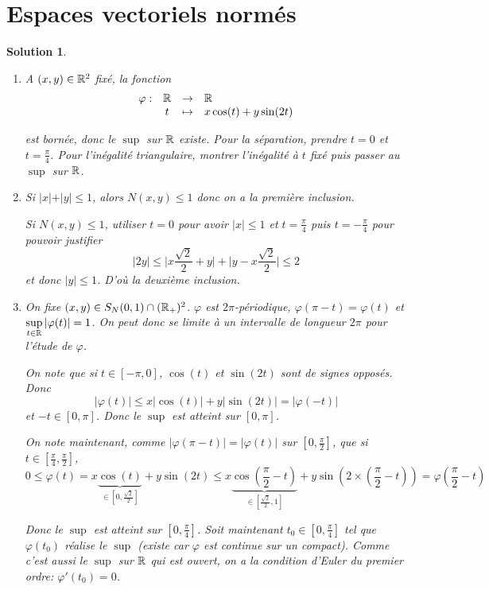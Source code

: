 \documentclass[12pt]{article}
\newtheorem{solution}{Solution}[section]
\theoremstyle{remark}
\newcommand{\function}[5]{
	$$
	\begin{array}{rccl}
		#1: & #2 & \to & #3 \\
		& #4 & \mapsto & #5
	\end{array}
	$$
}
\numberwithin{equation}{section}
\begin{document}
\section{Espaces vectoriels normés}

\begin{solution}
	\phantom{}
	\begin{enumerate}
		\item A $(x,y)\in\mathbb{R}^{2}$ fixé, la fonction \function{\varphi}{\R}{\R}{t}{x\cos(t)+y\sin(2t)}
		est bornée, donc le $\sup$ sur $\mathbb{R}$ existe. Pour la séparation, prendre $t=0$ et $t=\frac{\pi}{4}$. Pour l'inégalité triangulaire, montrer l'inégalité à $t$ fixé puis passer au $\sup$ sur $\mathbb{R}$.
		
		\item Si $\vert x\vert+\vert y\vert\leqslant1$, alors $N(x,y)\leqslant 1$ donc on a la première inclusion. 
		
		Si $N(x,y)\leqslant 1$, utiliser $t=0$ pour avoir $\vert x\vert\leqslant1$ et $t=\frac{\pi}{4}$ puis $t=-\frac{\pi}{4}$ pour pouvoir justifier
		$$\vert 2y\vert\leqslant \Biggl\vert x\frac{\sqrt{2}}{2}+y\Biggr\vert+\Biggl\vert y-x\frac{\sqrt{2}}{2}\Biggr\vert\leqslant 2$$
		et donc $\vert y\vert\leqslant1$. D'où la deuxième inclusion. 

		\item On fixe $(x,y)\in S_{N}(0,1)\cap(\mathbb{R}_{+})^{2}$. $\varphi$ est $2\pi$-périodique, $\varphi(\pi-t)=\varphi(t)$ et $\sup\limits_{t\in\mathbb{R}}\vert\varphi(t)\vert=1$. On peut donc se limite à un intervalle de longueur $2\pi$ pour l'étude de $\varphi$. 
		
		On note que si $t\in[-\pi,0]$, $\cos(t)$ et $\sin(2t)$ sont de signes opposés. Donc
		$$\vert\varphi(t)\vert\leqslant x\vert\cos(t)\vert+y\vert\sin(2t)\vert=\vert\varphi(-t)\vert$$
		et $-t\in[0,\pi]$. Donc le $\sup$ est atteint sur $[0,\pi]$.

		On note maintenant, comme $\vert\varphi(\pi-t)\vert=\vert\varphi(t)\vert$ sur $[0,\frac{\pi}{2}]$, que si $t\in[\frac{\pi}{4},\frac{\pi}{2}]$,
		$$0\leqslant\varphi(t)=x\underbrace{\cos(t)}_{\in[0,\frac{\sqrt{2}}{2}]}+y\sin(2t)\leqslant x\underbrace{\cos(\frac{\pi}{2}-t)}_{\in[\frac{\sqrt{2}}{2},1]}+y\sin(2\times (\frac{\pi}{2}-t))=\varphi(\frac{\pi}{2}-t)$$

		Donc le $\sup$ est atteint sur $[0,\frac{\pi}{4}]$. Soit maintenant $t_{0}\in[0,\frac{\pi}{4}]$ tel que $\varphi(t_{0})$ réalise le $\sup$ (existe car $\varphi$ est continue sur un compact). Comme c'est aussi le $\sup$ sur $\mathbb{R}$ qui est ouvert, on a la condition d'Euler du premier ordre: $\varphi'(t_{0})=0$.


\end{enumerate}
\end{solution}
\end{document}
